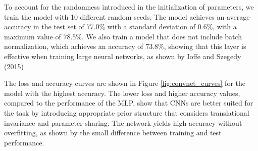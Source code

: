 \documentclass{article}
\begin{document}
To account for the randomness introduced in the initialization of parameters, we train the model with 10 different random seeds. The model achieves an average accuracy in the test set of 77.0\% with a standard deviation of 0.6\%, with a maximum value of 78.5\%. We also train a model that does not include batch normalization, which achieves an accuracy of 73.8\%, showing that this layer is effective when training large neural networks, as shown by Ioffe and Szegedy (2015) \cite{ioffe2015batchnorm}.


The loss and accuracy curves are shown in Figure \ref{fig:convnet_curves} for the model with the highest accuracy. The lower loss and higher accuracy values, compared to the performance of the MLP, show that CNNs are better suited for the task by introducing appropriate prior structure that considers translational invariance and parameter sharing. The network yields high accuracy without overfitting, as shown by the small difference between training and test performance.
\end{document}
